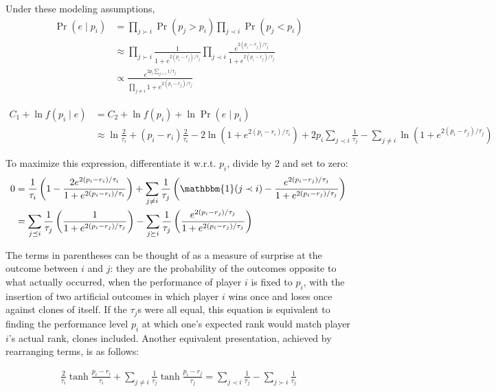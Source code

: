 \documentclass{article}
\begin{document}
Under these modeling assumptions,
\begin{align}
\Pr(e\mid p_i) &= \prod_{j \succ i} \Pr(p_j > p_i) \prod_{j \prec i} \Pr(p_j < p_i)
\\&\approx \prod_{j \succ i} \frac {1} {1 + e^{2(p_i-r_j)/\tau_j}} \prod_{j \prec i} \frac {e^{2(p_i-r_j)/\tau_j}} {1 + e^{2(p_i-r_j)/\tau_j}}
\\&\propto \frac {e^{2p_i\sum_{j\prec i}1/\tau_j}} {\prod_{j\neq i} 1 + e^{2(p_i-r_j)/\tau_j}}
\end{align}

\begin{align}
C_1 + \ln f(p_i\mid e) &= C_2 + \ln f(p_i) + \ln \Pr(e\mid p_i)
\\&\approx \ln \frac{2}{\tau_i} + (p_i-r_i)\frac{2}{\tau_i} - 2\ln\left(1 + e^{2(p_i-r_i)/\tau_i} \right) + 2p_i\sum_{j\prec i} \frac{1}{\tau_j} - \sum_{j\neq i} \ln\left(1 + e^{2(p_i-r_j)/\tau_j}\right)
\end{align}

To maximize this expression, differentiate it w.r.t. $p_i$, divide by 2 and set to zero:
\begin{align}
0 &= \frac{1}{\tau_i}\left(1 - \frac {2e^{2(p_i-r_i)/\tau_i}} {1 + e^{2(p_i-r_i)/\tau_i}} \right) + \sum_{j\neq i}\frac{1}{\tau_j}\left(\mathbbm{1}(j\prec i) - \frac {e^{2(p_i-r_j)/\tau_j}} {1 + e^{2(p_i-r_j)/\tau_j}} \right)
\\&= \sum_{j\preceq i}\frac{1}{\tau_j}\left(\frac {1} {1 + e^{2(p_i-r_j)/\tau_j}} \right)
	- \sum_{j\succeq i}\frac{1}{\tau_j}\left(\frac {e^{2(p_i-r_j)/\tau_j}} {1 + e^{2(p_i-r_j)/\tau_j}} \right)
\end{align}

The terms in parentheses can be thought of as a measure of surprise at the outcome between $i$ and $j$: they are the probability of the outcomes opposite to what actually occurred, when the performance of player $i$ is fixed to $p_i$, with the insertion of two artificial outcomes in which player $i$ wins once and loses once against clones of itself. If the $\tau_j$s were all equal, this equation is equivalent to finding the performance level $p_i$ at which one's expected rank would match player $i$'s actual rank, clones included. Another equivalent presentation, achieved by rearranging terms, is as follows:

\begin{align}
\frac{2}{\tau_i} \tanh\frac {p_i - r_i} {\tau_i} + \sum_{j\neq i}\frac{1}{\tau_j} \tanh\frac {p_i - r_j} {\tau_j} = \sum_{j\prec i} \frac{1}{\tau_j} - \sum_{j\succ i} \frac{1}{\tau_j}
\end{align}
\end{document}
